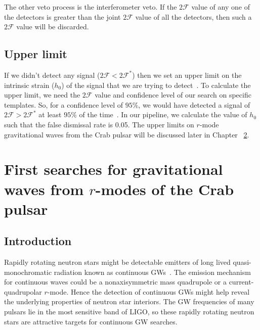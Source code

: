 \documentclass{ttuthes2007}
\begin{document}
The other veto process is the interferometer veto. If the $2\mathcal{F}$ value
of any one of the detectors is greater than the joint $2\mathcal{F}$ value of
all the detectors, then such a $2\mathcal{F}$ value will be discarded. 

\section{Upper limit}
If we didn't detect any signal ($2\mathcal{F}<2\mathcal{F}^*$) then we set an
upper limit on the intrinsic strain ($h_0$) of the signal that we are trying to
detect~\cite{Romano_2017}. To calculate the upper limit, we need the
$2\mathcal{F}$ value and confidence level of our search on specific templates. 
So, for a confidence level of $95\%$, we would have detected a signal of
$2\mathcal{F}>2\mathcal{F}^*$ at least $95\%$ of the time~\cite{Romano_2017}. In
our pipeline, we calculate the value of $h_0$ such that the false dismissal rate
is 0.05.
The upper limits on $r$-mode gravitational waves from the Crab pulsar will be
discussed later in Chapter ~\ref{chapter:6}.

\chapter{\textbf{First searches for gravitational waves from $r$-modes of the
Crab pulsar}}\label{chapter:6}

\section{Introduction}

Rapidly rotating neutron stars might be detectable emitters of long lived
quasi-monochromatic radiation known as continuous
\acp{GW}~\cite{Glampedakis2018}. The emission mechanism for continuous waves
could be a nonaxisymmetric mass quadrupole or a current-quadrupolar $r$-mode.
Hence the detection of continuous \acp{GW} might help reveal the underlying
properties of neutron star interiors. The \ac{GW} frequencies of many pulsars
lie in the most sensitive band of \ac{LIGO}, so these rapidly rotating
neutron stars are attractive targets for continuous \ac{GW} searches.
\end{document}
